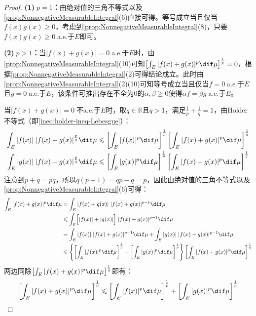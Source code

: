 \begin{proof}
	\textbf{(1)$\;p=1$：}由绝对值的三角不等式以及\cref{prop:NonnegativeMeasurableIntegral}(6)直接可得。等号成立当且仅当$f(x)g(x)\geqslant0$，考虑到\cref{prop:NonnegativeMeasurableIntegral}(8)，只要$f(x)g(x)\geqslant0\;$a.e.于$E$即可。\par
	\textbf{(2)$\;p>1$：}当$|f(x)+g(x)|=0\;$a.e.于$E$时，由\cref{prop:NonnegativeMeasurableIntegral}(10)可知$\left[\int_{E}^{}|f(x)+g(x)|^p\dif\mu\right]^\frac{1}{p}=0$，根据\cref{prop:NonnegativeMeasurableIntegral}(2)可得结论成立。此时由\cref{prop:NonnegativeMeasurableIntegral}(2)(10)可知等号成立当且仅当$f=0\;$a.e.于$E$且$g=0\;$a.e.于$E$，该条件可推出存在不全为$0$的$\alpha,\beta\geqslant0$使得$\alpha f=\beta g\;$a.e.于$E$。\par
	当$|f(x)+g(x)|=0\;$不a.e.于$E$时，取$q\in\mathbb{R}$且$q>1$，满足$\frac{1}{p}+\frac{1}{q}=1$，由Holder不等式（即\cref{ineq:holder-ineq-Lebesgue}）：
	\begin{gather*}
		\int_{E}^{}|f(x)|\;|f(x)+g(x)|^\frac{p}{q}\dif\mu\leqslant\left[\int_{E}^{}|f(x)|^p\dif\mu\right]^\frac{1}{p}\left[\int_{E}^{}|f(x)+g(x)|^p\dif\mu\right]^\frac{1}{q} \\
		\int_{E}^{}|g(x)|\;|f(x)+g(x)|^\frac{p}{q}\dif\mu\leqslant\left[\int_{E}^{}|g(x)|^p\dif\mu\right]^\frac{1}{p}\left[\int_{E}^{}|f(x)+g(x)|^p\dif\mu\right]^\frac{1}{q}
	\end{gather*}
	注意到$p+q=pq$，所以$q(p-1)=qp-q=p$，因此由绝对值的三角不等式以及\cref{prop:NonnegativeMeasurableIntegral}(6)可得：
	\begin{align*}
		\int_{E}^{}|f(x)+g(x)|^p\dif\mu
		&=\int_{E}^{}|f(x)+g(x)|\;|f(x)+g(x)|^{p-1}\dif\mu \\
		&\leqslant\int_{E}^{}\Bigl[|f(x)|+|g(x)|\Bigr]\;|f(x)+g(x)|^{p-1}\dif\mu \\
		&=\int_{E}^{}|f(x)|\;|f(x)+g(x)|^{p-1}\dif\mu+\int_{E}^{}|g(x)|\;|f(x)+g(x)|^{p-1}\dif\mu \\
		&\leqslant\left\{\left[\int_{E}^{}|f(x)|^p\dif\mu\right]^\frac{1}{p}+\left[\int_{E}^{}|g(x)|^p\dif\mu\right]^\frac{1}{p}\right\}\left[\int_{E}^{}|f(x)+g(x)|^p\dif\mu\right]^\frac{1}{q}
	\end{align*}
	两边同除$\left[\int_{E}^{}|f(x)+g(x)|^p\dif\mu\right]^\frac{1}{q}$即有：
	\begin{equation*}
			\left[\int_{E}^{}|f(x)+g(x)|^p\dif\mu\right]^\frac{1}{p}\leqslant\left[\int_{E}^{}|f(x)|^p\dif\mu\right]^\frac{1}{p}+\left[\int_{E}^{}|g(x)|^p\dif\mu\right]^\frac{1}{p}
	\end{equation*}

\end{proof}
